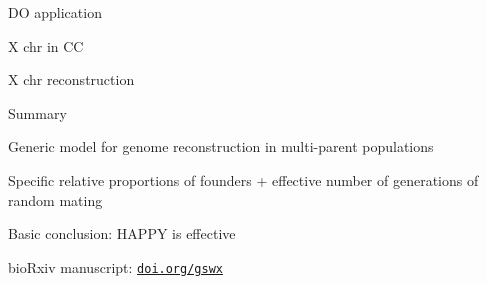 \documentclass[aspectratio=169,12pt,t]{beamer}
\begin{document}
\begin{frame}[c]{DO application}

  \note{
  }

\end{frame}





\begin{frame}[c]{X chr in CC}

  \note{
  }

\end{frame}





\begin{frame}[c]{X chr reconstruction}

  \note{
  }

\end{frame}





\begin{frame}[c]{Summary}

  \bbi

\item Generic model for genome reconstruction in multi-parent
  populations

\item Specific relative proportions of founders + effective number of
  generations of random mating

\item Basic conclusion: {\hilit HAPPY is effective}

\item bioRxiv manuscript:
  \href{https://doi.org/gswx}{\tt \lolit doi.org/gswx}


  \ei


\end{frame}
\end{document}
